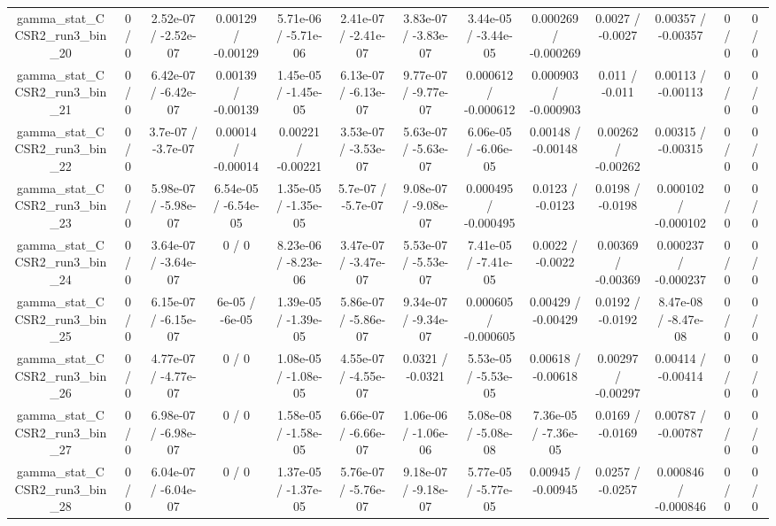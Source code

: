 \documentclass[10pt]{article}
\begin{document}
\begin{table}[htbp]
\begin{center}
\begin{tabular}{|c|c|c|c|c|c|c|c|c|c|c|c|c|}
  gamma_stat_CCSR2_run3_bin_20 & 0 / 0 & 2.52e-07 / -2.52e-07 & 0.00129 / -0.00129 & 5.71e-06 / -5.71e-06 & 2.41e-07 / -2.41e-07 & 3.83e-07 / -3.83e-07 & 3.44e-05 / -3.44e-05 & 0.000269 / -0.000269 & 0.0027 / -0.0027 & 0.00357 / -0.00357 & 0 / 0 & 0 / 0 \\ 
  gamma_stat_CCSR2_run3_bin_21 & 0 / 0 & 6.42e-07 / -6.42e-07 & 0.00139 / -0.00139 & 1.45e-05 / -1.45e-05 & 6.13e-07 / -6.13e-07 & 9.77e-07 / -9.77e-07 & 0.000612 / -0.000612 & 0.000903 / -0.000903 & 0.011 / -0.011 & 0.00113 / -0.00113 & 0 / 0 & 0 / 0 \\ 
  gamma_stat_CCSR2_run3_bin_22 & 0 / 0 & 3.7e-07 / -3.7e-07 & 0.00014 / -0.00014 & 0.00221 / -0.00221 & 3.53e-07 / -3.53e-07 & 5.63e-07 / -5.63e-07 & 6.06e-05 / -6.06e-05 & 0.00148 / -0.00148 & 0.00262 / -0.00262 & 0.00315 / -0.00315 & 0 / 0 & 0 / 0 \\ 
  gamma_stat_CCSR2_run3_bin_23 & 0 / 0 & 5.98e-07 / -5.98e-07 & 6.54e-05 / -6.54e-05 & 1.35e-05 / -1.35e-05 & 5.7e-07 / -5.7e-07 & 9.08e-07 / -9.08e-07 & 0.000495 / -0.000495 & 0.0123 / -0.0123 & 0.0198 / -0.0198 & 0.000102 / -0.000102 & 0 / 0 & 0 / 0 \\ 
  gamma_stat_CCSR2_run3_bin_24 & 0 / 0 & 3.64e-07 / -3.64e-07 & 0 / 0 & 8.23e-06 / -8.23e-06 & 3.47e-07 / -3.47e-07 & 5.53e-07 / -5.53e-07 & 7.41e-05 / -7.41e-05 & 0.0022 / -0.0022 & 0.00369 / -0.00369 & 0.000237 / -0.000237 & 0 / 0 & 0 / 0 \\ 
  gamma_stat_CCSR2_run3_bin_25 & 0 / 0 & 6.15e-07 / -6.15e-07 & 6e-05 / -6e-05 & 1.39e-05 / -1.39e-05 & 5.86e-07 / -5.86e-07 & 9.34e-07 / -9.34e-07 & 0.000605 / -0.000605 & 0.00429 / -0.00429 & 0.0192 / -0.0192 & 8.47e-08 / -8.47e-08 & 0 / 0 & 0 / 0 \\ 
  gamma_stat_CCSR2_run3_bin_26 & 0 / 0 & 4.77e-07 / -4.77e-07 & 0 / 0 & 1.08e-05 / -1.08e-05 & 4.55e-07 / -4.55e-07 & 0.0321 / -0.0321 & 5.53e-05 / -5.53e-05 & 0.00618 / -0.00618 & 0.00297 / -0.00297 & 0.00414 / -0.00414 & 0 / 0 & 0 / 0 \\ 
  gamma_stat_CCSR2_run3_bin_27 & 0 / 0 & 6.98e-07 / -6.98e-07 & 0 / 0 & 1.58e-05 / -1.58e-05 & 6.66e-07 / -6.66e-07 & 1.06e-06 / -1.06e-06 & 5.08e-08 / -5.08e-08 & 7.36e-05 / -7.36e-05 & 0.0169 / -0.0169 & 0.00787 / -0.00787 & 0 / 0 & 0 / 0 \\ 
  gamma_stat_CCSR2_run3_bin_28 & 0 / 0 & 6.04e-07 / -6.04e-07 & 0 / 0 & 1.37e-05 / -1.37e-05 & 5.76e-07 / -5.76e-07 & 9.18e-07 / -9.18e-07 & 5.77e-05 / -5.77e-05 & 0.00945 / -0.00945 & 0.0257 / -0.0257 & 0.000846 / -0.000846 & 0 / 0 & 0 / 0 \\ 

\end{tabular}
\end{center}
\end{table}
\end{document}
